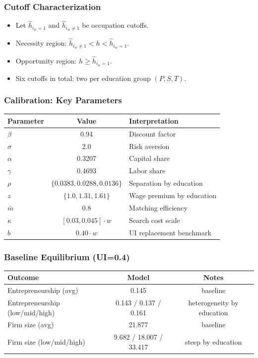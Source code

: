 ﻿\documentclass[english,aspectratio=169]{beamer}
\begin{document}
\begin{frame}
\frametitle{Cutoff Characterization}
\begin{itemize}
\item Let $\hat h_{i_w=1}$ and $\hat h_{i_w\neq 1}$ be occupation cutoffs.
\item Necessity region: $\hat h_{i_w\neq 1}<h<\hat h_{i_w=1}$.
\item Opportunity region: $h\geq\hat h_{i_w=1}$.
\item Six cutoffs in total: two per education group $(P,S,T)$.
\end{itemize}
\end{frame}

\begin{frame}
\frametitle{Calibration: Key Parameters}
\begin{center}
\small
\begin{tabular}{lcl}
\hline
Parameter & Value & Interpretation \\
\hline
$\beta$ & 0.94 & Discount factor \\
$\sigma$ & 2.0 & Risk aversion \\
$\alpha$ & 0.3207 & Capital share \\
$\gamma$ & 0.4693 & Labor share \\
$\rho$ & $\{0.0383,0.0288,0.0136\}$ & Separation by education \\
$z$ & $\{1.0,1.31,1.61\}$ & Wage premium by education \\
$\bar m$ & 0.8 & Matching efficiency \\
$\kappa$ & $[0.03,0.045]\cdot w$ & Search cost scale \\
$b$ & $0.40\cdot w$ & UI replacement benchmark \\
\hline
\end{tabular}
\end{center}
\end{frame}

\begin{frame}
\frametitle{Baseline Equilibrium (UI=0.4)}
\begin{center}
\small
\begin{tabular}{lcc}
\hline
Outcome & Model & Notes \\
\hline
Entrepreneurship (avg) & 0.145 & baseline \\
Entrepreneurship (low/mid/high) & 0.143 / 0.137 / 0.161 & heterogeneity by education \\
Firm size (avg) & 21.877 & baseline \\
Firm size (low/mid/high) & 9.682 / 18.007 / 33.417 & steep by education \\
\hline
\end{tabular}
\end{center}
\end{frame}
\end{document}
